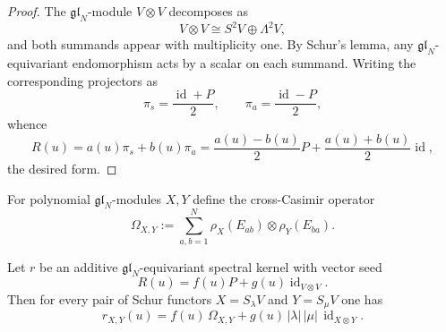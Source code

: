\begin{proof}
The $\mathfrak{gl}_N$-module $V\otimes V$ decomposes as
\begin{equation}
V\otimes V\cong S^2V\oplus \Lambda^2V,
\end{equation}
and both summands appear with multiplicity one. By Schur's lemma, any
$\mathfrak{gl}_N$-equivariant endomorphism acts by a scalar on each
summand. Writing the corresponding projectors as
\begin{equation}
\pi_s=\frac{\operatorname{id}+P}{2},
\qquad
\pi_a=\frac{\operatorname{id}-P}{2},
\end{equation}
whence
\begin{equation}
R(u)=a(u)\pi_s+b(u)\pi_a
=\frac{a(u)-b(u)}{2}P+\frac{a(u)+b(u)}{2}\operatorname{id},
\end{equation}
the desired form.
\end{proof}

For polynomial $\mathfrak{gl}_N$-modules $X,Y$ define the cross-Casimir
operator
\begin{equation}
\Omega_{X,Y}:=\sum_{a,b=1}^N \rho_X(E_{ab})\otimes \rho_Y(E_{ba}).
\end{equation}

\begin{theorem}
\ClaimStatusProvedHere
\label{thm:schur-envelope-formula}
Let $r$ be an additive $\mathfrak{gl}_N$-equivariant spectral kernel with
vector seed
\begin{equation}
R(u)=f(u)P+g(u)\operatorname{id}_{V\otimes V}.
\end{equation}
Then for every pair of Schur functors $X=S_\lambda V$ and
$Y=S_\mu V$ one has
\begin{equation}
\label{eq:schur-envelope-formula}
r_{X,Y}(u)=f(u)\,\Omega_{X,Y}+g(u)\,|\lambda|\,|\mu|\,\operatorname{id}_{X\otimes Y}.
\end{equation}
\end{theorem}

